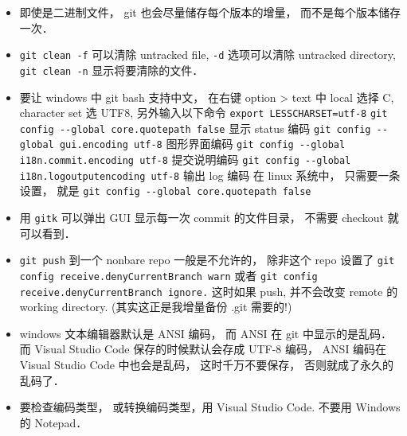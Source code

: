 \begin{itemize}
\item 即使是二进制文件， git 也会尽量储存每个版本的增量， 而不是每个版本储存一次．
\item \verb|git clean -f| 可以清除 untracked file, \verb|-d| 选项可以清除 untracked directory,  \verb|git clean -n| 显示将要清除的文件．
\item 要让 windows 中 git bash 支持中文， 在右键 option > text 中 local 选择 C, character set 选 UTF8, 另外输入以下命令
\verb|export LESSCHARSET=utf-8|
\verb|git config --global core.quotepath false|     显示 status 编码
\verb|git config --global gui.encoding utf-8|    图形界面编码
\verb|git config --global i18n.commit.encoding utf-8|   提交说明编码
\verb|git config --global i18n.logoutputencoding utf-8| 输出 log 编码
在 linux 系统中， 只需要一条设置， 就是
\verb|git config --global core.quotepath false|
\item 用 \verb|gitk| 可以弹出 GUI 显示每一次 commit 的文件目录， 不需要 checkout 就可以看到．
\item \verb|git push| 到一个 nonbare repo 一般是不允许的， 除非这个 repo 设置了 \verb|git config receive.denyCurrentBranch warn| 或者 \verb|git config receive.denyCurrentBranch ignore.| 这时如果 push, 并不会改变 remote 的 working directory. (其实这正是我增量备份 .git 需要的!)
\item windows 文本编辑器默认是 ANSI 编码， 而 ANSI 在 git 中显示的是乱码． 而 Visual Studio Code 保存的时候默认会存成 UTF-8 编码， ANSI 编码在 Visual Studio Code 中也会是乱码， 这时千万不要保存， 否则就成了永久的乱码了．
\item 要检查编码类型， 或转换编码类型，用 Visual Studio Code.  不要用 Windows 的 Notepad．
\end{itemize}

